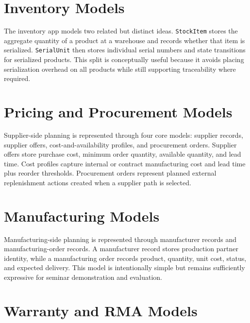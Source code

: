\documentclass[12pt,letterpaper,oneside,openany]{book}
\begin{document}
\section{Inventory Models}

\begin{justifying}
The inventory app models two related but distinct ideas. \texttt{StockItem}
stores the aggregate quantity of a product at a warehouse and records whether
that item is serialized. \texttt{SerialUnit} then stores individual serial
numbers and state transitions for serialized products. This split is conceptually
useful because it avoids placing serialization overhead on all products while
still supporting traceability where required.
\end{justifying}

\section{Pricing and Procurement Models}

\begin{justifying}
Supplier-side planning is represented through four core models: supplier
records, supplier offers, cost-and-availability profiles, and procurement
orders. Supplier offers store purchase cost, minimum order quantity, available
quantity, and lead time. Cost profiles capture internal or contract
manufacturing cost and lead time plus reorder thresholds. Procurement orders
represent planned external replenishment actions created when a supplier path
is selected.
\end{justifying}

\section{Manufacturing Models}

\begin{justifying}
Manufacturing-side planning is represented through manufacturer records and
manufacturing-order records. A manufacturer record stores production partner
identity, while a manufacturing order records product, quantity, unit cost,
status, and expected delivery. This model is intentionally simple but remains
sufficiently expressive for seminar demonstration and evaluation.
\end{justifying}

\section{Warranty and RMA Models}
\end{document}
